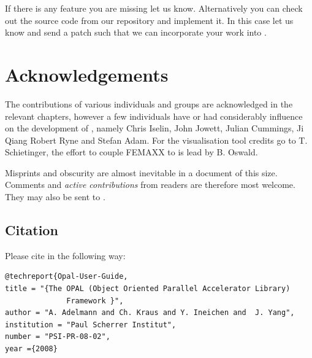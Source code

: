 If there is any feature you are missing let us know. Alternatively you can check out the source code from our repository and implement it. In this case let us know and send a patch such that we can incorporate your work into \opal.
\clearpage
\section{Acknowledgements}
The contributions of various individuals and groups are acknowledged in the relevant chapters, however a few individuals have or had considerably influence on the 
development of \opal, namely Chris Iselin, John Jowett, Julian Cummings, Ji Qiang Robert Ryne and Stefan Adam. For the \partroot visualisation tool credits go to T. Schietinger,
the effort to couple FEMAXX to \opal is lead by B. Oswald. 

Misprints and obscurity are almost inevitable in a document of this size.
Comments and {\em active contributions}  from readers are therefore most welcome.
They may also be sent to .




\subsection{Citation}
Please cite \opal in the following way:
\begin{small}
\begin{verbatim} 
@techreport{Opal-User-Guide,
title = "{The OPAL (Object Oriented Parallel Accelerator Library) 
              Framework }",
author = "A. Adelmann and Ch. Kraus and Y. Ineichen and  J. Yang",
institution = "Paul Scherrer Institut",
number = "PSI-PR-08-02",
year ={2008}
\end{verbatim}
\end{small}




